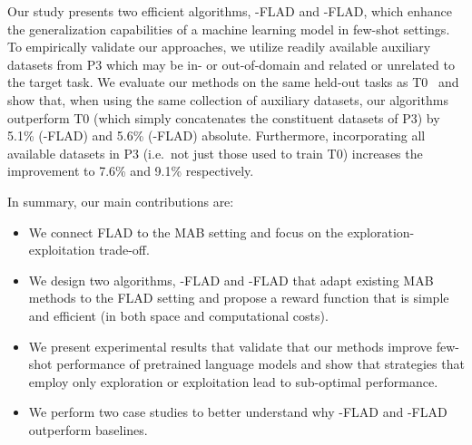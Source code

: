Our study presents two efficient algorithms, \ex{}-FLAD and \ucb{}-FLAD, which enhance the generalization capabilities of a machine learning model in few-shot settings. To empirically validate our approaches, we utilize readily available auxiliary datasets from P3 \citep{bach-etal-2022-promptsource} which may be in- or out-of-domain and related or unrelated to the target task. We evaluate our methods on the same held-out tasks as T0~\citep{sanh2022multitask} and show that, when using the same collection of auxiliary datasets, our algorithms outperform T0 (which simply concatenates the constituent datasets of P3) by 5.1\% (\ex{}-FLAD) and 5.6\% (\ucb{}-FLAD) absolute. Furthermore, incorporating all available datasets in P3 (i.e.\ not just those used to train T0) increases the improvement to 7.6\% and 9.1\% respectively.


In summary, our main contributions are:
\begin{itemize}[nosep]
    \item We connect FLAD to the MAB setting and focus on the exploration-exploitation trade-off.
    \item We design two algorithms, \ex{}-FLAD and \ucb{}-FLAD that adapt existing MAB methods to the FLAD setting and propose a reward function that is simple and efficient (in both space and computational costs). 
    \item We present experimental results that validate that our methods improve few-shot performance of pretrained language models and show that strategies that employ only exploration or exploitation lead to sub-optimal performance.
    \item We perform two case studies to better understand why \ex{}-FLAD and \ucb{}-FLAD outperform baselines.
\end{itemize}

